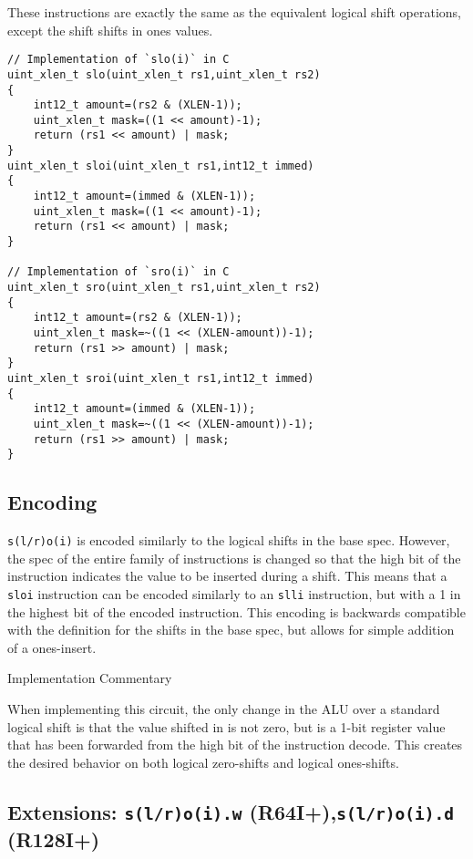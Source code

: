 These instructions are exactly the same as the equivalent logical shift
operations, except the shift shifts in ones values.

\begin{verbatim}
// Implementation of `slo(i)` in C
uint_xlen_t slo(uint_xlen_t rs1,uint_xlen_t rs2)
{
    int12_t amount=(rs2 & (XLEN-1));
    uint_xlen_t mask=((1 << amount)-1);
    return (rs1 << amount) | mask;
}
uint_xlen_t sloi(uint_xlen_t rs1,int12_t immed)
{
    int12_t amount=(immed & (XLEN-1));
    uint_xlen_t mask=((1 << amount)-1);
    return (rs1 << amount) | mask;
}

// Implementation of `sro(i)` in C
uint_xlen_t sro(uint_xlen_t rs1,uint_xlen_t rs2)
{
    int12_t amount=(rs2 & (XLEN-1));
    uint_xlen_t mask=~((1 << (XLEN-amount))-1);
    return (rs1 >> amount) | mask;
}
uint_xlen_t sroi(uint_xlen_t rs1,int12_t immed)
{
    int12_t amount=(immed & (XLEN-1));
    uint_xlen_t mask=~((1 << (XLEN-amount))-1);
    return (rs1 >> amount) | mask;
}
\end{verbatim}

\subsection{Encoding}



\texttt{s(l/r)o(i)} is encoded similarly to the logical shifts in the
base spec. However, the spec of the entire family of instructions is
changed so that the high bit of the instruction indicates the value to
be inserted during a shift. This means that a \texttt{sloi} instruction
can be encoded similarly to an \texttt{slli} instruction, but with a 1
in the highest bit of the encoded instruction. This encoding is
backwards compatible with the definition for the shifts in the base
spec, but allows for simple addition of a ones-insert.

Implementation Commentary

When implementing this circuit, the only change in the ALU over a
standard logical shift is that the value shifted in is not zero, but is
a 1-bit register value that has been forwarded from the high bit of the
instruction decode. This creates the desired behavior on both logical
zero-shifts and logical ones-shifts.

\subsection{Extensions: \texttt{s(l/r)o(i).w} (R64I+),\texttt{s(l/r)o(i).d} (R128I+)}

